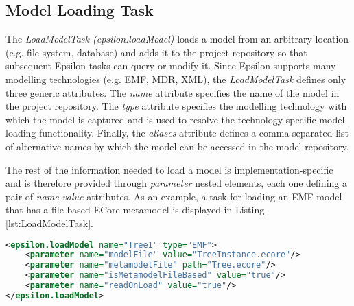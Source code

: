 \subsection{Model Loading Task}

The \textit{LoadModelTask (epsilon.loadModel)} loads a model from an arbitrary location (e.g. file-system, database) and adds it to the project repository so that subsequent Epsilon tasks can query or modify it. Since Epsilon supports many modelling technologies (e.g. EMF, MDR, XML), the \textit{LoadModelTask} defines only three generic attributes. The \textit{name} attribute specifies the name of the model in the project repository. The \textit{type} attribute specifies the modelling technology with which the model is captured and is used to resolve the technology-specific model loading functionality. Finally, the \textit{aliases} attribute defines a comma-separated list of alternative names by which the model can be accessed in the model repository.

The rest of the information needed to load a model is implementation-specific and is therefore provided through \textit{parameter} nested elements, each one defining a pair of \textit{name}-\textit{value} attributes. As an example, a task for loading an EMF model that has a file-based ECore metamodel is displayed in Listing \ref{lst:LoadModelTask}.

\begin{lstlisting}[float=tbp, basicstyle=\ttfamily\footnotesize, nolol=true, flexiblecolumns=true, caption=Loading an EMF model using the epsilon.loadModel task, label=lst:LoadModelTask, language=XML]
<epsilon.loadModel name="Tree1" type="EMF">
	<parameter name="modelFile" value="TreeInstance.ecore"/>
	<parameter name="metamodelFile" path="Tree.ecore"/>
	<parameter name="isMetamodelFileBased" value="true"/>
	<parameter name="readOnLoad" value="true"/>
</epsilon.loadModel>
\end{lstlisting}
